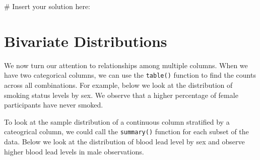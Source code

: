 \documentclass[
  letterpaper,
]{krantz}
\makeatletter
\newenvironment{Shaded}{\begin{snugshade}}{\end{snugshade}}
\newcommand{\CommentTok}[1]{\textcolor[rgb]{0.37,0.37,0.37}{#1}}
\newcommand{\FunctionTok}[1]{\textcolor[rgb]{0.28,0.35,0.67}{#1}}
\newcommand{\NormalTok}[1]{\textcolor[rgb]{0.00,0.23,0.31}{#1}}
\newcommand{\SpecialCharTok}[1]{\textcolor[rgb]{0.37,0.37,0.37}{#1}}
\newcommand{\StringTok}[1]{\textcolor[rgb]{0.13,0.47,0.30}{#1}}
\newenvironment{kframe}{%
\medskip{}
\setlength{\fboxsep}{.8em}
 \def\at@end@of@kframe{}%
 \ifinner\ifhmode%
  \def\at@end@of@kframe{\end{minipage}}%
  \begin{minipage}{\columnwidth}%
 \fi\fi%
 \def\FrameCommand##1{\hskip\@totalleftmargin \hskip-\fboxsep
 \colorbox{shadecolor}{##1}\hskip-\fboxsep
     \hskip-\linewidth \hskip-\@totalleftmargin \hskip\columnwidth}%
 \MakeFramed {\advance\hsize-\width
   \@totalleftmargin\z@ \linewidth\hsize
   \@setminipage}}%
 {\par\unskip\endMakeFramed%
 \at@end@of@kframe}
\renewenvironment{Shaded}{\begin{kframe}}{\end{kframe}}
\makeatother
\begin{document}
\begin{Shaded}
\begin{Highlighting}[]
\CommentTok{\# Insert your solution here:}
\end{Highlighting}
\end{Shaded}

\section{Bivariate Distributions}\label{bivariate-distributions}

We now turn our attention to relationships among multiple columns. When
we have two categorical columns, we can use the \texttt{table()}
function to find the counts across all combinations. For example, below
we look at the distribution of smoking status levels by sex. We observe
that a higher percentage of female participants have never smoked.

\begin{Shaded}
\end{Shaded}

To look at the sample distribution of a continuous column stratified by
a cateogrical column, we could call the \texttt{summary()} function for
each subset of the data. Below we look at the distribution of blood lead
level by sex and observe higher blood lead levels in male observations.

\begin{Shaded}
\end{Shaded}
\end{document}
